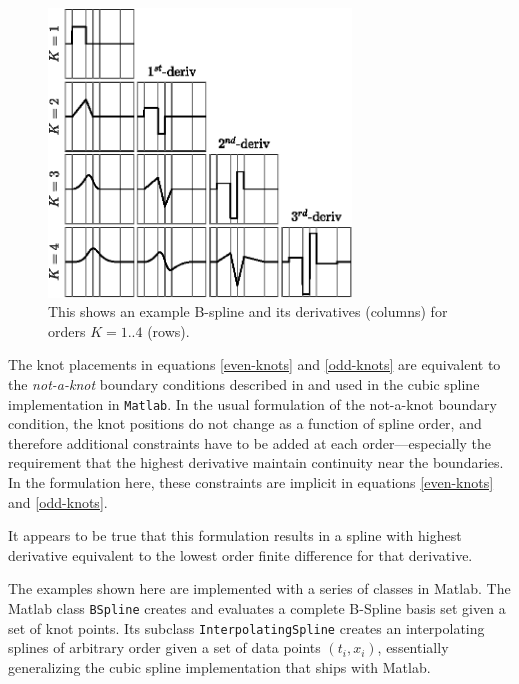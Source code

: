 \documentclass[10pt,journal]{IEEEtran}
\begin{document}
\begin{figure}
  \centerline{\includegraphics[width=19pc,angle=0]{figures/bsplines}}
  \caption{This shows an example B-spline and its derivatives (columns) for orders $K=1..4$ (rows).}
  \label{bsplines}
\end{figure}

The knot placements in equations \ref{even-knots} and \ref{odd-knots} are equivalent to the \textit{not-a-knot} boundary conditions described in \cite{deboor1978-book} and used in the cubic spline implementation in \texttt{Matlab}. In the usual formulation of the not-a-knot boundary condition, the knot positions do not change as a function of spline order, and therefore additional constraints have to be added at each order---especially the requirement that the highest derivative maintain continuity near the boundaries. In the formulation here, these constraints are implicit in equations \ref{even-knots} and \ref{odd-knots}.

It appears to be true that this formulation results in a spline with highest derivative equivalent to the lowest order finite difference for that derivative.

The examples shown here are implemented with a series of classes in Matlab. The Matlab class \texttt{BSpline} creates and evaluates a complete B-Spline basis set given a set of knot points. Its subclass \texttt{InterpolatingSpline} creates an interpolating splines of arbitrary order given a set of data points $(t_i, x_i)$, essentially generalizing the cubic spline implementation that ships with Matlab.
\end{document}
